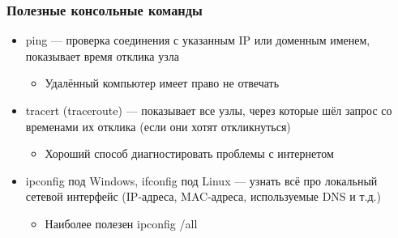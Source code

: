 \documentclass[xetex,mathserif,serif]{beamer}
\begin{document}
    \begin{frame}
        \frametitle{Полезные консольные команды}
        \begin{itemize}
            \item ping --- проверка соединения с указанным IP или доменным именем, показывает время отклика узла
            \begin{itemize}
                \item Удалённый компьютер имеет право не отвечать
            \end{itemize}
            \item tracert (traceroute) --- показывает все узлы, через которые шёл запрос со временами их отклика (если они хотят откликнуться)
            \begin{itemize}
                \item Хороший способ диагностировать проблемы с интернетом
            \end{itemize}
            \item ipconfig под Windows, ifconfig под Linux --- узнать всё про локальный сетевой интерфейс (IP-адреса, MAC-адреса, используемые DNS и т.д.)
            \begin{itemize}
                \item Наиболее полезен ipconfig /all
            \end{itemize}
        \end{itemize}
    \end{frame}
\end{document}

